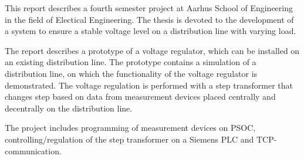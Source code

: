 
This report describes a fourth semester project at Aarhus School of Engineering in the field of Electical Engineering. The thesis is devoted to the development of a system to ensure a stable voltage level on a distribution line with varying load.

The report describes a prototype of a voltage regulator, which can be installed on an existing distribution line. The prototype contains a simulation of a distribution line, on which the functionality of the voltage regulator is demonstrated. The voltage regulation is performed with a step transformer that changes step based on data from measurement devices placed centrally and decentrally on the distribution line. 

The project includes programming of measurement devices on PSOC, controlling/regulation of the step transformer on a Siemens PLC and TCP-communication.

